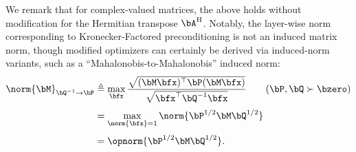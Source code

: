We remark that for complex-valued matrices, the above holds without modification for the Hermitian transpose $\bA^{\mathrm H}$.
Notably, the layer-wise norm corresponding to Kronecker-Factored preconditioning is not an induced matrix norm, though modified optimizers can certainly be derived via induced-norm variants, such as a ``Mahalonobis-to-Mahalonobis'' induced norm:
\begin{align*}
    \norm{\bM}_{\bQ^{-1} \to \bP} &\triangleq \max_{\bfx} \frac{\sqrt{(\bM\bfx)^\top \bP(\bM \bfx)}}{\sqrt{\bfx^\top \bQ^{-1} \bfx}} \tag{$\bP, \bQ \succ \bzero$} \\[0.1cm]
    &= \max_{\norm{\bfx} = 1} \norm{\bP^{1/2} \bM \bQ^{1/2}}\\[0.1cm]
    &= \opnorm{\bP^{1/2} \bM \bQ^{1/2}}.
\end{align*}
